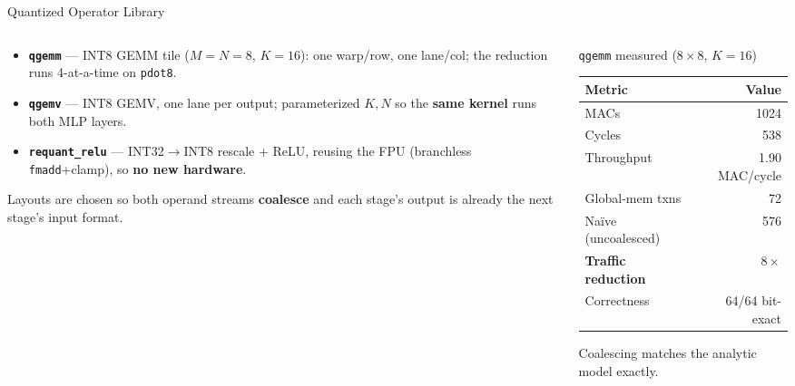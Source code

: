 \documentclass[aspectratio=169,11pt]{beamer}
\newcommand{\hl}[1]{{\color{simtixaccent}\textbf{#1}}}
\newcommand{\navy}[1]{{\color{simtixblue}\textbf{#1}}}
\begin{document}
\begin{frame}{Quantized Operator Library}
  \begin{columns}[T]
    \begin{column}{0.5\textwidth}
      \begin{itemize}
        \item \navy{\texttt{qgemm}} --- INT8 GEMM tile ($M{=}N{=}8$, $K{=}16$): one warp/row, one
          lane/col; the reduction runs 4-at-a-time on \texttt{pdot8}.
        \item \navy{\texttt{qgemv}} --- INT8 GEMV, one lane per output; parameterized $K,N$ so the
          \hl{same kernel} runs both MLP layers.
        \item \navy{\texttt{requant\_relu}} --- INT32$\rightarrow$INT8 rescale + ReLU, reusing the FPU
          (branchless \texttt{fmadd}+clamp), so \hl{no new hardware}.
      \end{itemize}
      \vspace{0.2em}
      {\footnotesize Layouts are chosen so both operand streams \hl{coalesce} and each stage's
      output is already the next stage's input format.}
    \end{column}
    \begin{column}{0.5\textwidth}
      \begin{block}{\texttt{qgemm} measured ($8{\times}8$, $K{=}16$)}
        \small
        \begin{tabular}{@{}lr@{}}
          \toprule
          Metric & Value \\
          \midrule
          MACs                 & 1024 \\
          Cycles               & 538 \\
          Throughput           & 1.90 MAC/cycle \\
          Global-mem txns      & 72 \\
          Naïve (uncoalesced)  & 576 \\
          \hl{Traffic reduction} & \hl{$8\times$} \\
          Correctness          & 64/64 bit-exact \\
          \bottomrule
        \end{tabular}
      \end{block}
      {\footnotesize Coalescing matches the analytic model exactly.}
    \end{column}
  \end{columns}
\end{frame}
\end{document}

